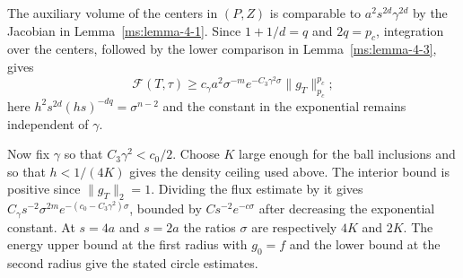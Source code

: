 The auxiliary volume of the centers in $(P,Z)$ is comparable to $a^2s^{2d}\gamma^{2d}$ by the Jacobian in Lemma~\ref{ms:lemma-4-1}. Since $1+1/d=q$ and $2q=p_c$, integration over the centers, followed by the lower comparison in Lemma~\ref{ms:lemma-4-3}, gives
\[
\mathcal F(T,\tau)\ge c_\gamma a^2\sigma^{-m}e^{-C_3\gamma^2\sigma}\|g_T\|_{p_c}^{p_c};
\]
here $h^2s^{2d}(hs)^{-dq}=\sigma^{n-2}$ and the constant in the exponential remains independent of $\gamma$.

Now fix $\gamma$ so that $C_3\gamma^2<c_0/2$. Choose $K$ large enough for the ball inclusions and so that $h<1/(4K)$ gives the density ceiling used above. The interior bound is positive since $\|g_T\|_2=1$. Dividing the flux estimate by it gives $C_\gamma s^{-2}\sigma^{2m}e^{-(c_0-C_3\gamma^2)\sigma}$, bounded by $Cs^{-2}e^{-c\sigma}$ after decreasing the exponential constant. At $s=4a$ and $s=2a$ the ratios $\sigma$ are respectively $4K$ and $2K$. The energy upper bound at the first radius with $g_0=f$ and the lower bound at the second radius give the stated circle estimates.
